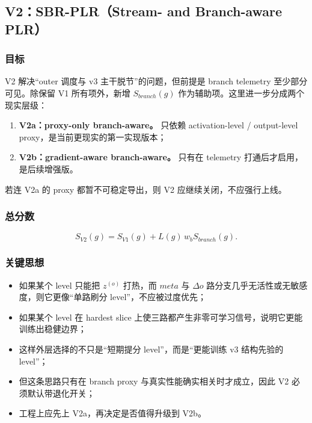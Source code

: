 \documentclass[11pt,a4paper]{ctexart}
\begin{document}
\subsection{V2：SBR-PLR（Stream- and Branch-aware PLR）}
\subsubsection*{目标}
V2 解决“outer 调度与 v3 主干脱节”的问题，但前提是 branch telemetry 至少部分可见。除保留 V1 所有项外，新增 \(S_{branch}(g)\) 作为辅助项。这里进一步分成两个现实层级：
\begin{enumerate}[leftmargin=2.2em,itemsep=0.2em]
    \item \textbf{V2a：proxy-only branch-aware。} 只依赖 activation-level / output-level proxy，是当前更现实的第一实现版本；
    \item \textbf{V2b：gradient-aware branch-aware。} 只有在 telemetry 打通后才启用，是后续增强版。
\end{enumerate}
若连 V2a 的 proxy 都暂不可稳定导出，则 V2 应继续关闭，不应强行上线。

\subsubsection*{总分数}
\begin{equation}
S_{V2}(g)=S_{V1}(g)+L(g)\,w_b S_{branch}(g).
\label{eq:sv2}
\end{equation}

\subsubsection*{关键思想}
\begin{itemize}[leftmargin=2.2em,itemsep=0.25em]
    \item 如果某个 level 只能把 \(z^{(o)}\) 打热，而 \(meta\) 与 \(\Delta o\) 路分支几乎无活性或无敏感度，则它更像“单路刷分 level”，不应被过度优先；
    \item 如果某个 level 在 hardest slice 上使三路都产生非零可学习信号，说明它更能训练出稳健边界；
    \item 这样外层选择的不只是“短期提分 level”，而是“更能训练 v3 结构先验的 level”；
    \item 但这条思路只有在 branch proxy 与真实性能确实相关时才成立，因此 V2 必须默认带退化开关；
    \item 工程上应先上 V2a，再决定是否值得升级到 V2b。
\end{itemize}
\end{document}

